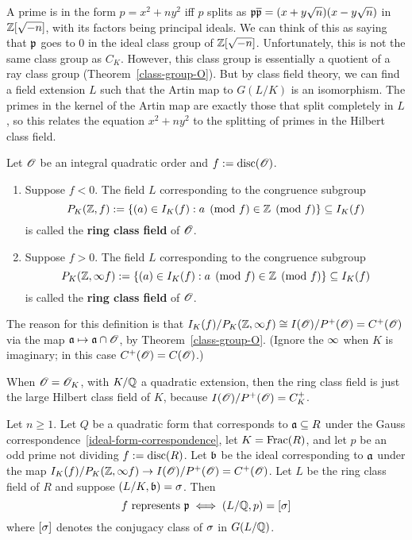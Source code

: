 A prime is in the form $p=x^2+ny^2$ iff $p$ splits as $\mathfrak{p}\overline{\mathfrak{p}}=(x+y\sqrt n)(x-y\sqrt n)$ in $\mathbb{Z}[\sqrt{-n}]$, with its factors being principal ideals. We can think of this as saying that $\mathfrak{p}$ goes to 0 in the ideal class group of $\mathbb{Z}[\sqrt{-n}]$. Unfortunately, this is not the same class group as $C_K$. However, this class group is %
essentially a quotient of a ray class group (Theorem~\ref{class-group-O}).
But by class field theory, we can find a field extension $L$ such that the Artin map to $G(L/K)$ is an isomorphism. The primes in the kernel of the Artin map are exactly those that split completely in $L$, so this relates the equation $x^2+ny^2$ to the splitting of primes in the Hilbert class field.
\begin{df}
Let $\mathscr{O}$ be an integral quadratic order and $f:=\operatorname{disc}(\mathscr{O})$. 
\begin{enumerate}
\item Suppose $f<0$. 
The field $L$ corresponding to the congruence subgroup 
\[P_K(\mathbb{Z},f):=\left\{{(a)\in I_K(f)}:{a\pmod f\in \mathbb{Z}\pmod f}\right\}\subseteq I_K(f)\]
is called the \textbf{ring class field} of $\mathscr{O}$.
\item Suppose $f>0$. 
The field $L$ corresponding to the congruence subgroup 
\[P_K(\mathbb{Z},\infty f):=\left\{{(a)\in I_K(f)}:{a\pmod f\in \mathbb{Z}\pmod f}\right\}\subseteq I_K(f)\]
is called the \textbf{ring class field} of $\mathscr{O}$. 
\end{enumerate}
\end{df}
The reason for this definition is that $I_K(f)/P_K(\mathbb{Z},\infty f)\cong I(\mathscr{O})/P^+(\mathscr{O})=C^+(\mathscr{O})$ via the map $\mathfrak{a}\mapsto \mathfrak{a}\cap \mathscr{O}$, by Theorem~\ref{class-group-O}. 
(Ignore the $\infty$ when $K$ is imaginary; in this case $C^+(\mathscr{O})=C(\mathscr{O})$.)
\begin{ex}
When $\mathscr{O}=\mathscr{O}_K$, with $K/\mathbb{Q}$ a quadratic extension, then the ring class field is just the large Hilbert class field of $K$, because $I(\mathscr{O})/P^+(\mathscr{O})=C_K^+$.
\end{ex}
\begin{thm}
Let $n\ge1$. Let $Q$ be a quadratic form that corresponds to $\mathfrak{a}\subseteq R$ under the Gauss correspondence~\ref{ideal-form-correspondence}, let $K=\operatorname{Frac}(R)$, and let $p$ be an odd prime not dividing $f:=\operatorname{disc}(R)$. 
Let $\mathfrak{b}$ be the ideal corresponding to $\mathfrak{a}$ under the map $I_K(f)/P_K(\mathbb{Z},\infty f)\to I(\mathscr{O})/P^+(\mathscr{O})=C^+(\mathscr{O})$. Let $L$ be the ring class field of $R$ and suppose $(L/K,\mathfrak{b})=\sigma$. Then
\[
f\text{ represents }\mfp\iff %
(L/\Q,p)=[\si]
\]
where $[\sigma]$ denotes the conjugacy class of $\sigma$ in $G(L/\mathbb{Q})$.
\end{thm}
